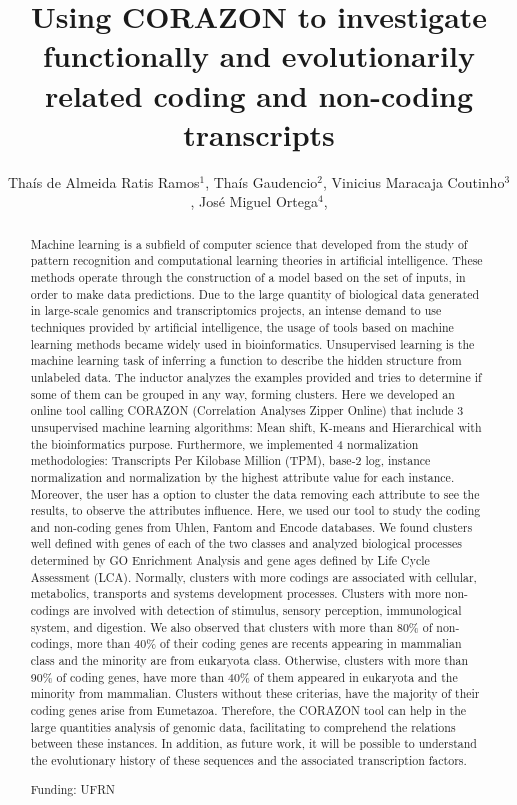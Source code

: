 \documentclass[twoside]{article}
\title{\vspace{-15mm}\fontsize{24pt}{10pt}\selectfont\textbf{ Using CORAZON to investigate functionally and evolutionarily related coding and non-coding transcripts }} %
\author{ Thaís de Almeida Ratis Ramos$^{1}$, Thaís Gaudencio$^{2}$, Vinicius Maracaja Coutinho$^{3}$, José Miguel Ortega$^{4}$, }
\affil{ 1 UFRN

2 UFPB

3 Universidad Mayor

4 Universidade Federal de Minas Gerais. Laboratório de Biodados.

 }
\date{}
\begin{document}
  
  
  \maketitle %
  
  
  \thispagestyle{fancy} %
  
  
  \begin{abstract}
  Machine learning is a subfield of computer science that developed from the study of pattern recognition and computational learning theories in artificial intelligence. These methods operate through the construction of a model based on the set of inputs, in order to make data predictions. Due to the large quantity of biological data generated in large-scale genomics and transcriptomics projects, an intense demand to use techniques provided by artificial intelligence, the usage of tools based on machine learning methods became widely used in bioinformatics. Unsupervised learning is the machine learning task of inferring a function to describe the hidden structure from unlabeled data. The inductor analyzes the examples provided and tries to determine if some of them can be grouped in any way, forming clusters. Here we developed an online tool calling CORAZON (Correlation Analyses Zipper Online) that include 3 unsupervised machine learning algorithms: Mean shift,  K-means and Hierarchical with the bioinformatics purpose. Furthermore, we implemented 4 normalization methodologies: Transcripts Per Kilobase Million (TPM), base-2 log, instance normalization and normalization by the highest attribute value for each instance. Moreover, the user has a option to cluster the data removing each attribute to see the results, to observe the attributes influence.  Here, we used our tool to study the coding and non-coding genes from Uhlen, Fantom and Encode databases. We found clusters well defined with genes of each of the two classes and analyzed biological processes determined by GO Enrichment Analysis and gene ages defined by Life Cycle Assessment (LCA). Normally, clusters with more codings are associated with cellular, metabolics, transports and systems development processes. Clusters with more non-codings are involved with detection of stimulus, sensory perception, immunological system, and digestion. We also observed that clusters with more than 80\% of non-codings, more than 40\% of their coding genes are recents appearing in mammalian class and the minority are from eukaryota class. Otherwise, clusters with more than 90\% of coding genes, have more than 40\% of them appeared in eukaryota and the minority from mammalian. Clusters without these criterias, have the majority of their coding genes arise from Eumetazoa. Therefore, the CORAZON tool can help in the large quantities analysis of genomic data, facilitating to comprehend the relations between these instances. In addition, as future work, it will be possible to understand the evolutionary history of these sequences and the associated transcription factors.
  
  Funding: UFRN \\ 
  \end{abstract}
  
\end{document}
